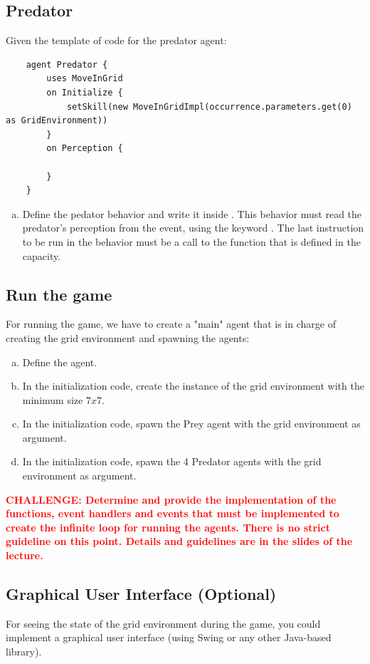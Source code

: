 \documentclass[english,nodocumentinfo,nopubpage]{utbmciadreport}
\begin{document}
\subsection{Predator}

Given the template of code for the predator agent:
\begin{lstlisting}
	agent Predator {
		uses MoveInGrid
		on Initialize {
			setSkill(new MoveInGridImpl(occurrence.parameters.get(0) as GridEnvironment))
		}
		on Perception {
			
		}
	}
\end{lstlisting}

\begin{enumerate}[a)]
	\item Define the pedator behavior and write it inside . This behavior must read the predator's perception from the  event, using the keyword . The last instruction to be run in the behavior must be a call to the function that is defined in the  capacity.
\end{enumerate}

\subsection{Run the game}

For running the game, we have to create a "main" agent that is in charge of creating the grid environment and spawning the agents:
\begin{enumerate}[a)]
	\item Define the  agent.
	\item In the initialization code, create the instance of the grid environment with the minimum size $7x7$.
	\item In the initialization code, spawn the Prey agent with the grid environment as argument.
	\item In the initialization code, spawn the 4 Predator agents with the grid environment as argument.
\end{enumerate}

\textbf{\textcolor{red}{CHALLENGE: Determine and provide the implementation of the functions,  event handlers and events that must be implemented to create the infinite loop for running the agents. There is no strict guideline on this point. Details and guidelines are in the slides of the lecture.}}

\subsection{Graphical User Interface (Optional)}

For seeing the state of the grid environment during the game, you could implement a graphical user interface (using Swing or any other Java-based library).
\end{document}

